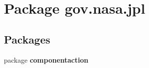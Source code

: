 \section{Package gov.\+nasa.\+jpl}
\label{namespacegov_1_1nasa_1_1jpl}
\subsection*{Packages}
\begin{DoxyCompactItemize}
\item 
package {\bf componentaction}
\end{DoxyCompactItemize}
